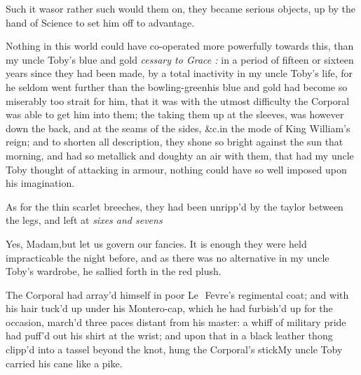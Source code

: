 \documentclass{article}
\begin{document}
Such it was\tsh or rather such would 
them on, they became serious objects,
up by the hand of Science to set him off to
advantage.

\etp

Nothing in this world could have co-operated more powerfully
towards this, than my uncle Toby’s blue and
gold\tsh\break 
{} 
\textit{cessary to Grace :} in a period of fifteen or sixteen years
since they had been made, by a total inactivity in my uncle
Toby’s life, for he seldom went further than the
bowling-green\tsk his blue and gold had become so miserably too
strait for him, that it was with the utmost difficulty the Corporal
was able to get him into them; the taking them up at the sleeves,
was\break
{} however down the
back, and at the seams of the sides, \&c.\@ in the mode of King
William’s reign; and to shorten all description, they
shone so bright against the sun that morning, and had so metallick
and doughty an air with them, that had my uncle Toby thought
of attacking in armour, nothing could have so well imposed upon his
imagination.

As for the thin scarlet breeches, they had been unripp’d
by the taylor between the legs, and left at \textit{sixes and
sevens}\tsh

\tsh Yes, Madam,\tsh but let us govern our
fancies. It is enough they were held impracticable the night
before, and as there was no alternative in my uncle
Toby’s wardrobe, he sallied forth in the red
plush.\etp

The Corporal had array’d himself in poor \hbox{Le\, Fevre’s}
regimental coat; and with his hair tuck’d up under
his Mon\-tero-cap, which he had furbish’d up for the occasion,
march’d three paces distant from his master: a whiff of military
pride had puff’d out his shirt at the wrist; and upon that in a
black leather thong clipp’d into a tassel beyond the knot, hung
the Corporal’s stick\tsh\break My uncle Toby carried his cane
like a pike.
\end{document}
